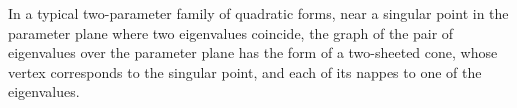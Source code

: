 In a typical two-parameter family of quadratic forms, near a singular point in the parameter plane where two eigenvalues coincide, the graph of the pair of eigenvalues over the parameter plane has the form of a two-sheeted cone, whose vertex corresponds to the singular point, and each of its nappes to one of the eigenvalues.
